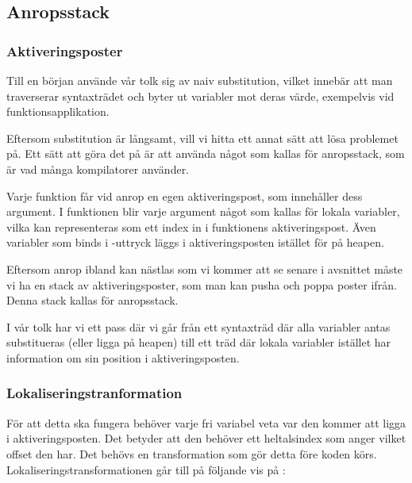 \documentclass[../Core]{subfiles}
\begin{document}
\subsection{Anropsstack}
\subsubsection{Aktiveringsposter}

Till en början använde vår tolk sig av naiv substitution, vilket innebär att man
traverserar syntaxträdet och byter ut variabler mot deras värde, exempelvis vid
funktionsapplikation.

Eftersom substitution är långsamt, vill vi hitta ett annat sätt att lösa problemet
på. Ett sätt att göra det på är att använda något som kallas för anropsstack, som
är vad många kompilatorer använder. %

Varje funktion får vid anrop en egen aktiveringspost, som innehåller dess argument.
I funktionen blir varje argument något som kallas för lokala variabler, vilka kan representeras
som ett index in i funktionens aktiveringspost. Även variabler som binds i
-uttryck läggs i aktiveringsposten istället för på heapen. 
  
Eftersom anrop ibland kan nästlas som vi kommer att se senare i avsnittet
måste vi ha en stack av aktiveringsposter, som man kan pusha och poppa poster ifrån.
Denna stack kallas för anropsstack.

I vår tolk har vi ett pass där vi går från ett syntaxträd där alla variabler
antas substitueras (eller ligga på heapen) till ett träd där lokala variabler
istället har information om sin position i aktiveringsposten.




\subsubsection{Lokaliseringstranformation}

För att detta ska fungera behöver varje fri variabel veta var den kommer att
ligga i aktiveringsposten. Det betyder att den behöver ett heltalsindex som anger
vilket offset den har. Det behövs en transformation som gör detta före koden 
körs. Lokaliseringstransformationen går till på följande vis på : 
\end{document}
